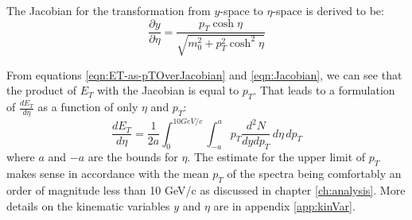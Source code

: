 The Jacobian for the transformation from $y$-space to $\eta$-space is derived to be:
\begin{equation}\label{eqn:Jacobian}
\frac{\partial y}{\partial \eta} = \frac{p_{T}\cosh\eta}{\sqrt{m_{0}^2+p_{T}^2\cosh^2\eta}}
\end{equation}

From equations \ref{eqn:ET-as-pTOverJacobian} and \ref{eqn:Jacobian}, we can see that the product of $E_{T}$ with the Jacobian is equal to $p_{T}$. That leads to a formulation of $\frac{dE_{T}}{d\eta}$ as a function of only $\eta$ and $p_{T}$:
\begin{equation}\label{eqn:dETOverdEta}
\frac{dE_{T}}{d\eta} = \frac{1}{2a}\int_{0}^{10GeV/c}\int_{-a}^{a} p_{T}\frac{d^{2}N}{dydp_{T}} \,d\eta\,dp_{T}
\end{equation}
where $a$ and $-a$ are the bounds for $\eta$. The estimate for the upper limit of $p_T{}$ makes sense in accordance with the mean $p_{T}$ of the spectra being comfortably an order of magnitude less than 10 GeV/c as discussed in chapter \ref{ch:analysis}. More details on the kinematic variables $y$ and $\eta$ are in appendix \ref{app:kinVar}.

